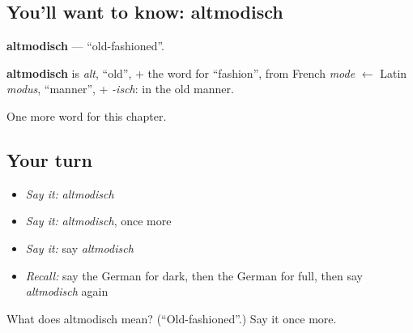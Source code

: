 \subsection*{You'll want to know: altmodisch}
\textbf{altmodisch} — \textquotedblleft{}old-fashioned\textquotedblright{}.

\begin{cousinweb}
\textbf{altmodisch} is \emph{alt}, \textquotedblleft{}old\textquotedblright{}, + the word for \textquotedblleft{}fashion\textquotedblright{}, from French \emph{mode} $\leftarrow$ Latin \emph{modus}, \textquotedblleft{}manner\textquotedblright{}, + \emph{-isch}: in the old manner.
\end{cousinweb}

\begin{grammarlens}[title={What you've built}]
One more word for this chapter.
\end{grammarlens}

\subsection*{Your turn}
\begin{itemize}
\raggedright
  \item \emph{Say it:} \emph{altmodisch}
  \item \emph{Say it:} \emph{altmodisch}, once more
  \item \emph{Say it:} say \emph{altmodisch}
  \item \emph{Recall:} say the German for dark, then the German for full, then say \emph{altmodisch} again
\end{itemize}

\begin{tcolorbox}[breakable,colback=teal!4,colframe=teal!35!black,title={Before you move on}]
What does altmodisch mean? (\textquotedblleft{}Old-fashioned\textquotedblright{}.) Say it once more.
\end{tcolorbox}
